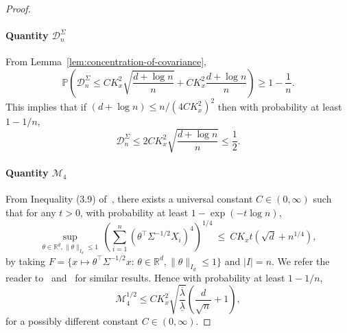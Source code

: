 \documentclass[11pt]{article}
\begin{document}
\begin{appendices}
\begin{proof}
\paragraph{Quantity $\mathcal{D}_n^{\Sigma}$} From Lemma~\ref{lem:concentration-of-covariance},
\[
\mathbb{P}\left(\mathcal{D}_n^{\Sigma} \le CK_x^2\sqrt{\frac{d + \log n}{n}} + CK_x^2\frac{d + \log n}{n}\right) \ge 1 - \frac{1}{n}.
\]
This implies that if $(d + \log n) \le n/(4CK_x^2)^2$ then with probability at least $1 - 1/n$, 
\begin{equation}\label{eq:quantity-D-Sigma}
\mathcal{D}_n^{\Sigma} \le 2CK_x^2\sqrt{\frac{d + \log n}{n}} \le \frac{1}{2}.
\end{equation}
\paragraph{Quantity $\mathcal{M}_4$} From Inequality (3.9) of~\cite{mendelson2010empirical}, there exists a universal constant $C\in(0,\infty)$ such that for any $t > 0$, with probability at least $1 - \exp(-t\log n)$,
\[
\sup_{\theta\in\mathbb{R}^d,\|\theta\|_{I_d} \le 1}\,\left(\sum_{i=1}^n (\theta^{\top}\Sigma^{-1/2}X_i)^4\right)^{1/4} ~\le~ CK_xt(\sqrt{d} + n^{1/4}),
\]
by taking $F = \{x\mapsto \theta^{\top}\Sigma^{-1/2}x:\,\theta\in\mathbb{R}^d, \|\theta\|_{I_d} \le 1\}$ and $|I| = n$. We refer the reader to~\cite{guedon2007lp} and~\cite{vershynin2011approximating} for similar results. Hence with probability at least $1 - 1/n$,
\begin{equation}\label{eq:quantity-M-4}
\mathcal{M}_4^{1/2} \le CK_x^2\sqrt{\frac{\overline{\lambda}}{\underline{\lambda}}}\left(\frac{d}{\sqrt{n}} + 1\right),
\end{equation}
for a possibly different constant $C\in(0,\infty)$. 

\end{proof}
\end{appendices}
\end{document}
